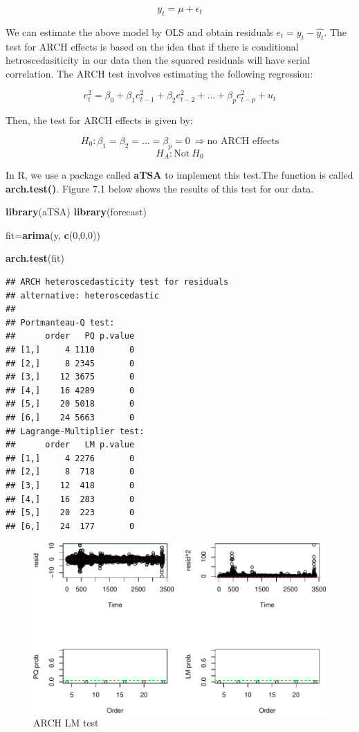 \documentclass[]{book}
\newenvironment{Shaded}{\begin{snugshade}}{\end{snugshade}}
\newcommand{\KeywordTok}[1]{\textcolor[rgb]{0.13,0.29,0.53}{\textbf{#1}}}
\newcommand{\DecValTok}[1]{\textcolor[rgb]{0.00,0.00,0.81}{#1}}
\newcommand{\NormalTok}[1]{#1}
\theoremstyle{definition}
\theoremstyle{definition}
\theoremstyle{definition}
\theoremstyle{remark}
\begin{document}
\[y_t=\mu +\epsilon_t\]

We can estimate the above model by OLS and obtain residuals \(e_t=y_t-\hat{y_t}\). The test for ARCH effects is based on the idea that if there is conditional hetroscedasiticity in our data then the squared residuals will have serial correlation. The ARCH test involves estimating the following regression:

\[e^2_t= \beta_0 +\beta_1 e^2_{t-1} + \beta_2 e^2_{t-2}+...+ \beta_p e^2_{t-p} + u_t\]

Then, the test for ARCH effects is given by:

\[H_0: \beta_1=\beta_2=...=\beta_p=0 \ \Rightarrow \text{no ARCH effects}\]
\[ H_A: \text{Not} \ H_0\]

In R, we use a package called \textbf{aTSA} to implement this test.The function is called \textbf{arch.test()}. Figure 7.1 below shows the results of this test for our data.

\begin{Shaded}
\begin{Highlighting}[]
\KeywordTok{library}\NormalTok{(aTSA)}
\KeywordTok{library}\NormalTok{(forecast)}

\NormalTok{fit=}\KeywordTok{arima}\NormalTok{(y, }\KeywordTok{c}\NormalTok{(}\DecValTok{0}\NormalTok{,}\DecValTok{0}\NormalTok{,}\DecValTok{0}\NormalTok{))}

\KeywordTok{arch.test}\NormalTok{(fit)}
\end{Highlighting}
\end{Shaded}

\begin{verbatim}
## ARCH heteroscedasticity test for residuals 
## alternative: heteroscedastic 
## 
## Portmanteau-Q test: 
##      order   PQ p.value
## [1,]     4 1110       0
## [2,]     8 2345       0
## [3,]    12 3675       0
## [4,]    16 4289       0
## [5,]    20 5018       0
## [6,]    24 5663       0
## Lagrange-Multiplier test: 
##      order   LM p.value
## [1,]     4 2276       0
## [2,]     8  718       0
## [3,]    12  418       0
## [4,]    16  283       0
## [5,]    20  223       0
## [6,]    24  177       0
\end{verbatim}

\begin{figure}
\centering
\includegraphics{bookdown-demo_files/figure-latex/table1-1.pdf}
\caption{\label{fig:table1}ARCH LM test}
\end{figure}
\end{document}
